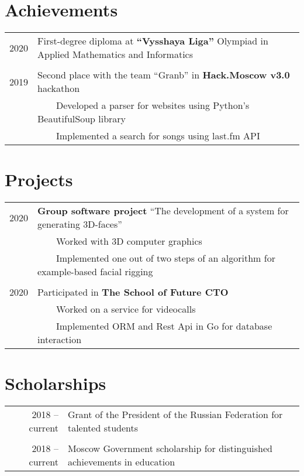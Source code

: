 \documentclass[a4paper,10pt]{article}
\newcommand{\tabitem}{~~\llap{\textbullet}~~}
\begin{document}
\section{Achievements}
\begin{tabular}{rl}
\hspace{0.9cm} 2020 & First-degree diploma at \textbf{``Vysshaya Liga''} Olympiad in Applied Mathematics and Informatics \\
&\\
\hspace{0.9cm} 2019 & Second place with the team “Granb” in \textbf{Hack.Moscow v3.0} hackathon \\
& \tabitem Developed a parser for websites using Python's BeautifulSoup library \\
& \tabitem Implemented a search for songs using last.fm API \\
\end{tabular}

\section{Projects}
\begin{tabular}{rl}
\hspace{0.9cm} 2020 & \textbf{Group software project} ``The development of a system for generating 3D-faces'' \\
& \tabitem Worked with 3D computer graphics \\
& \tabitem Implemented one out of two steps of an algorithm for example-based facial rigging\\
&\\
\hspace{0.9cm} 2020 & Participated in \textbf{The School of Future CTO} \\
& \tabitem Worked on a service for videocalls \\
& \tabitem Implemented ORM and Rest Api in Go for database interaction \\
\end{tabular}

\section{Scholarships}
\begin{tabular}{rl}
2018 -- current & Grant of the President of the Russian Federation for talented students \\
&\\
2018 -- current & Moscow Government scholarship for distinguished achievements in education \\
\end{tabular}
\end{document}
